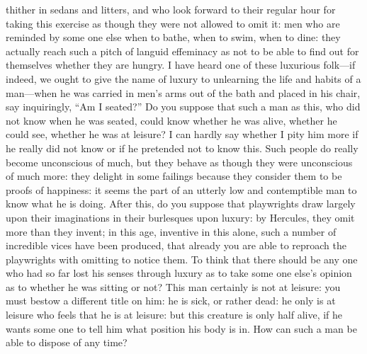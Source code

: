 \documentclass[12pt]{article}
\begin{document}
thither in sedans and litters, and who look forward to their regular hour for taking this exercise as though they were not allowed to omit it: men who are reminded by some one else when to bathe, when to swim, when to dine: they actually reach such a pitch of languid effeminacy as not to be able to find out for themselves whether they are hungry. I have heard one of these luxurious folk—if indeed, we ought to give the name of luxury to unlearning the life and habits of a man—when he was carried in men’s arms out of the bath and placed in his chair, say inquiringly, “Am I seated?” Do you suppose that such a man as this, who did not know when he was seated, could know whether he was alive, whether he could see, whether he was at leisure? I can hardly say whether I pity him more if he really did not know or if he pretended not to know this. Such people do really become unconscious of much, but they behave as though they were unconscious of much more: they delight in some failings because they consider them to be proofs of happiness: it seems the part of an utterly low and contemptible man to know what he is doing. After this, do you suppose that playwrights draw largely upon their imaginations in their burlesques upon luxury: by Hercules, they omit more than they invent; in this age, inventive in this alone, such a number of incredible vices have been produced, that already you are able to reproach the playwrights with omitting to notice them. To think that there should be any one who had so far lost his senses through luxury as to take some one else’s opinion as to whether he was sitting or not? This man certainly is not at leisure: you must bestow a different title on him: he is sick, or rather dead: he only is at leisure who feels that he is at leisure: but this creature is only half alive, if he wants some one to tell him what position his body is in. How can such a man be able to dispose of any time?
\end{document}
